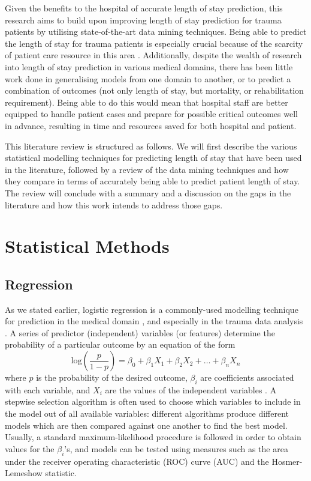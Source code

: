 Given the benefits to the hospital of accurate length of stay prediction,
this research aims to build upon improving length of stay prediction for trauma
patients by utilising state-of-the-art data mining techniques. Being able to
predict the length of stay for trauma patients is especially crucial because of
the scarcity of patient care resource in this area \citep{Yang2010}.
Additionally,
despite the wealth of research into length of stay prediction in various
medical domains, there has been little work done in generalising models from
one domain to another, or to predict a combination of outcomes (not only
length of stay, but mortality, or rehabilitation requirement). Being able to
do this would mean that hospital staff are better equipped to handle patient
cases and prepare for possible critical outcomes well in advance, resulting
in time and resources saved for both hospital and patient.

This literature review is structured as follows. We will first describe the
various statistical modelling techniques for predicting length of stay that
have been used in the literature, followed by a review of the data mining
techniques and how they compare in terms of accurately being able to predict
patient length of stay. The review will conclude with a summary and a
discussion on the gaps in the literature and how this work intends to address
those gaps.

\section{Statistical Methods}
\subsection{Regression}
As we stated earlier, logistic regression is a commonly-used modelling
technique for prediction in the medical domain \citep{Tu1996}, and especially
in the trauma data analysis \citep{Gabbe2005}. A series of
predictor (independent) variables (or features) determine the probability of a
particular outcome by an equation of the form
\begin{equation}
\mathrm{log}\left(\frac{p}{1-p}\right) = \beta_0 + \beta_1X_1 + \beta_2X_2 + \dots + \beta_nX_n
\end{equation}
where $p$ is the probability of the desired outcome, $\beta_i$ are coefficients
associated with each variable, and $X_i$ are the values of the independent
variables \citep{Hosmer1989}. A stepwise selection algorithm is often used to
choose which variables to include in the model out of all available variables:
different algorithms produce different models which are then compared against
one another to find the best model. Usually, a standard maximum-likelihood
procedure is followed in order to obtain values for the $\beta_i$'s, and models
can be tested using measures such as the area under the receiver operating
characteristic (ROC) curve (AUC) and the Hosmer-Lemeshow statistic.

